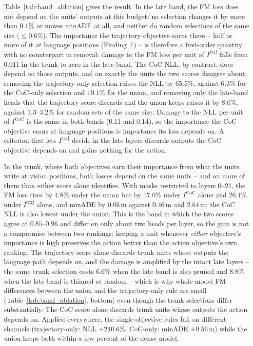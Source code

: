 Table~\ref{tab:band_ablation} gives the result. In the late band, the FM loss does not depend on the units' outputs at this budget: no selection changes it by more than $0.1\%$ or moves minADE at all, and neither do random selections of the same size ($\le 0.6\%$). The importance the trajectory objective earns there -- half or more of it at language positions (Finding~1) -- is therefore a first-order quantity with no counterpart in removal: damage to the FM loss per unit of $I^{\mathrm{traj}}$ falls from $0.011$ in the trunk to zero in the late band. The CoC NLL, by contrast, does depend on those outputs, and on exactly the units the two scores disagree about: removing the trajectory-only selection raises the NLL by $65.5\%$, against $6.3\%$ for the CoC-only selection and $10.1\%$ for the union, and removing only the late-band heads that the trajectory score discards and the union keeps raises it by $8.6\%$, against $1.3$--$3.2\%$ for random sets of the same size. Damage to the NLL per unit of $I^{\mathrm{CoC}}$ is the same in both bands ($0.11$ and $0.14$), so the importance the CoC objective earns at language positions is importance its loss depends on. A criterion that lets $I^{\mathrm{traj}}$ decide in the late layers discards outputs the CoC objective depends on and gains nothing for the action.

In the trunk, where both objectives earn their importance from what the units write at vision positions, both losses depend on the same units -- and on more of them than either score alone identifies. With masks restricted to layers 0--21, the FM loss rises by $4.8\%$ under the union but by $17.0\%$ under $I^{\mathrm{CoC}}$ alone and $26.1\%$ under $I^{\mathrm{traj}}$ alone, and minADE by $0.06$\,m against $0.46$\,m and $2.64$\,m; the CoC NLL is also lowest under the union. This is the band in which the two scores agree at $0.85$--$0.96$ and differ on only about two heads per layer, so the gain is not a compromise between two rankings: keeping a unit whenever \emph{either} objective's importance is high preserves the action better than the action objective's own ranking. The trajectory score alone discards trunk units whose outputs the language path depends on, and the damage is amplified by the intact late layers -- the same trunk selection costs $6.6\%$ when the late band is also pruned and $8.8\%$ when the late band is thinned at random -- which is why whole-model FM differences between the union and the trajectory-only rule are small (Table~\ref{tab:band_ablation}, bottom) even though the trunk selections differ substantially. The CoC score alone discards trunk units whose outputs the action depends on. Applied everywhere, the single-objective rules fail on different channels (trajectory-only: NLL $+240.6\%$; CoC-only: minADE $+0.56$\,m) while the union keeps both within a few percent of the dense model.

